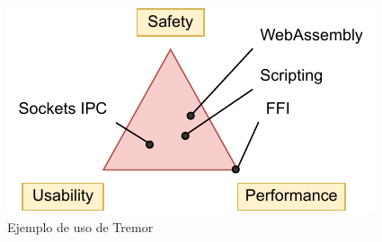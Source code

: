 \begin{figure}
    \centering
    \includegraphics[width=\textwidth]{./Imagenes/triangle.pdf}
    \caption{Ejemplo de uso de Tremor}%
    \label{fig:example_tremor}
\end{figure}
